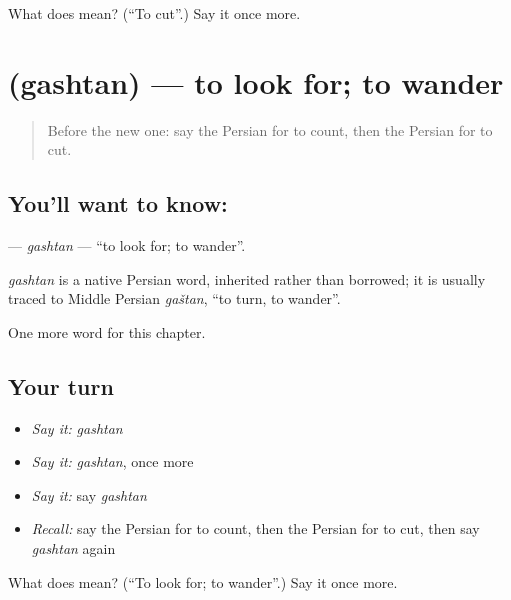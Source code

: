 \begin{tcolorbox}[breakable,colback=teal!4,colframe=teal!35!black,title={Before you move on}]
What does  mean? (\textquotedblleft{}To cut\textquotedblright{}.) Say it once more.
\end{tcolorbox}
\section[\texorpdfstring{\fa{گشتن} (gashtan)}{گشتن (gashtan)}]{ (gashtan) — to look for; to wander}

\label{lesson:FA-C39-gashtan}



\begin{quote}
Before the new one: say the Persian for to count, then the Persian for to cut.
\end{quote}

\subsection*{You'll want to know: }
\textbf{} — \emph{gashtan} — \textquotedblleft{}to look for; to wander\textquotedblright{}.

\begin{cousinweb}
\emph{gashtan} is a native Persian word, inherited rather than borrowed; it is usually traced to Middle Persian \emph{gaštan}, \textquotedblleft{}to turn, to wander\textquotedblright{}.
\end{cousinweb}

\begin{grammarlens}[title={What you've built}]
One more word for this chapter.
\end{grammarlens}

\subsection*{Your turn}
\begin{itemize}
\raggedright
  \item \emph{Say it:} \emph{gashtan}
  \item \emph{Say it:} \emph{gashtan}, once more
  \item \emph{Say it:} say \emph{gashtan}
  \item \emph{Recall:} say the Persian for to count, then the Persian for to cut, then say \emph{gashtan} again
\end{itemize}

\begin{tcolorbox}[breakable,colback=teal!4,colframe=teal!35!black,title={Before you move on}]
What does  mean? (\textquotedblleft{}To look for; to wander\textquotedblright{}.) Say it once more.
\end{tcolorbox}

